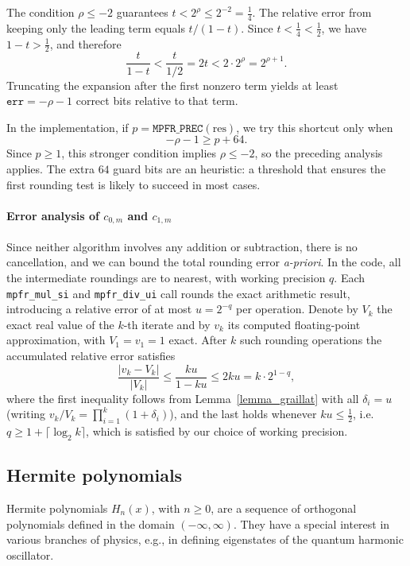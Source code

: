 \documentclass[12pt]{amsart}
\begin{document}
The condition $\rho \le -2$ guarantees
$t < 2^\rho \le 2^{-2} = \tfrac{1}{4}$.
The relative error from keeping only the leading term equals $t/(1-t)$.
Since $t < \tfrac{1}{4} < \tfrac{1}{2}$, we have $1 - t > \tfrac{1}{2}$,
and therefore
\[
  \frac{t}{1-t} < \frac{t}{1/2} = 2t < 2 \cdot 2^\rho = 2^{\rho+1}.
\]
Truncating the expansion after the first nonzero term yields at least
$\mathtt{err} = -\rho - 1$ correct bits relative to that term.

In the implementation, if $p = \texttt{MPFR\_PREC}(\mathrm{res})$, we try this
shortcut only when
\[
  -\rho - 1 \ge p + 64.
\]
Since $p \ge 1$, this stronger condition implies $\rho \le -2$, so the
preceding analysis applies. The extra $64$ guard bits are an heuristic:
a threshold that ensures the first rounding test is likely to succeed
in most cases.

\paragraph{\textbf{Error analysis of $c_{0,m}$ and $c_{1,m}$}}
\label{par:legendre-error-analysis}

Since neither algorithm involves any addition or subtraction, there is no
cancellation, and we can bound the total rounding error \textit{a-priori}.
In the code, all the intermediate roundings are to nearest, with working
precision $q$. Each \texttt{mpfr\_mul\_si} and \texttt{mpfr\_div\_ui} call
rounds the exact arithmetic result, introducing a relative error of at most
$u = 2^{-q}$ per operation. Denote by $V_k$ the exact real value of the
$k$-th iterate and by $v_k$ its computed floating-point approximation, with
$V_1 = v_1 = 1$ exact. After $k$ such rounding operations the accumulated
relative error satisfies
\[
  \frac{|v_k - V_k|}{|V_k|}
  \le \frac{ku}{1-ku}
  \le 2ku = k \cdot 2^{1-q},
\]
where the first inequality follows from Lemma~\ref{lemma_graillat} with all
$\delta_i = u$ (writing $v_k/V_k = \prod_{i=1}^k(1+\delta_i)$), and the last
holds whenever $ku \le \tfrac{1}{2}$, i.e. $q \ge 1 + \lceil\log_2 k\rceil$,
which is satisfied by our choice of working precision.

\subsection{Hermite polynomials}
\label{subsec:hermite-polynomials}

Hermite polynomials $H_n(x)$, with $n \geq 0$, are a sequence of orthogonal
polynomials defined in the domain $(-\infty,\infty)$. They have a special
interest in various branches of physics, e.g., in defining eigenstates
of the quantum harmonic oscillator.
\end{document}
